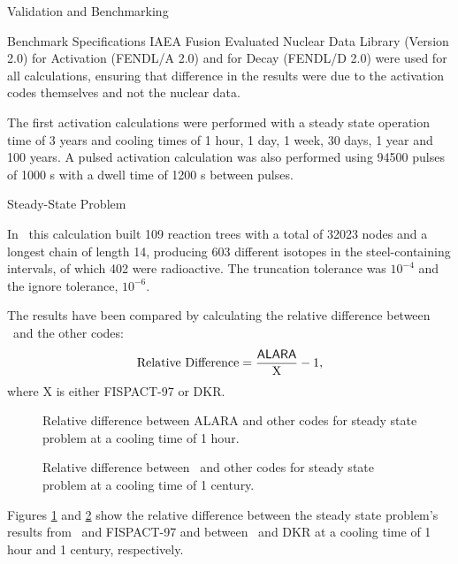 \begin{chapter}{Validation and Benchmarking\label{chap:valid}}
\begin{section}{Benchmark Specifications}
    IAEA Fusion Evaluated Nuclear Data Library (Version 2.0) for
    Activation (FENDL/A 2.0) and for Decay (FENDL/D 2.0) were used for
    all calculations, ensuring that difference in the results were due
    to the activation codes themselves and not the nuclear data.
    
    The first activation calculations were performed with a steady
    state operation time of 3 years and cooling times of 1 hour, 1
    day, 1 week, 30 days, 1 year and 100 years.  A pulsed activation
    calculation was also performed using 94500 pulses of 1000 s with a
    dwell time of 1200 s between pulses.
  \end{section}
  
  \begin{section}{Steady-State Problem}
    
    In \ALARA\, this calculation built 109 reaction trees with a total
    of 32023 nodes and a longest chain of length 14, producing 603
    different isotopes in the steel-containing intervals, of which 402
    were radioactive.  The truncation tolerance was $10^{-4}$ and the
    ignore tolerance, $10^{-6}$.
    
    The results have been compared by calculating the relative
    difference between \ALARA\ and the other codes:
    $$\mbox{Relative Difference} = \frac{\mbox{\textsf{ALARA}}}{\mbox{X}} - 1,$$
    where X is either FISPACT-97 or DKR.  
    
    \begin{figure}[htbp]
      \begin{center}
        \caption{Relative difference between ALARA and other codes for
          steady state problem at a cooling time of 1 hour.}
        \label{fig:rel.diff.ss.1}
      \end{center}
    \end{figure}
    
    \begin{figure}[htbp]
      \begin{center}
        \caption{Relative difference between \ALARA\  and other codes for
          steady state problem at a cooling time of 1 century.}
        \label{fig:rel.diff.ss.2}
      \end{center}
    \end{figure}
    
    Figures \ref{fig:rel.diff.ss.1} and \ref{fig:rel.diff.ss.2} show
    the relative difference between the steady state problem's results
    from \ALARA\ and FISPACT-97 and between \ALARA\ and DKR at a
    cooling time of 1 hour and 1 century, respectively.
    

\end{section}
\end{chapter}
